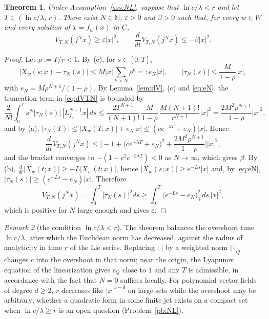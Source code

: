 \documentclass[preprint,12pt,authoryear]{elsarticle}
\newtheorem{theorem}{Theorem}
\theoremstyle{definition}
\theoremstyle{remark}
\newtheorem{remark}[theorem]{Remark}
\newcommand{\N}{\mathbb{N}}
\begin{document}
\begin{theorem}\label{thm:NL}
Under Assumption~\ref{ass:NL}, suppose that $\ln c/\lambda<r$ and let $T\in(\ln c/\lambda,\,r)$. There exist $N\in\N$, $\varepsilon>0$ and $\beta>0$ such that, for every $w\in W$ and every solution of $\dot x=f_w(x)$ in $C$,
\begin{equation}\label{eq:conclNL}
V_{T,N}(j^Nx)\ge\varepsilon|x|^2,\qquad\frac{d}{dt}V_{T,N}(j^Nx)\le-\beta|x|^2 .
\end{equation}
\end{theorem}
\begin{proof}
Let $\rho:=T/r<1$. By (c), for $s\in[0,T]$,
\begin{equation}\label{eq:eN}
|X_w(s;x)-\tau_N(s)|\le M|x|\sum_{k>N}\rho^k=:e_N|x|,\qquad |\tau_N(s)|\le\frac{M}{1-\rho}|x| ,
\end{equation}
with $e_N=M\rho^{N+1}/(1-\rho)$. By Lemma~\ref{lem:dV}, (c) and \eqref{eq:eN}, the truncation term in \eqref{eq:dVTN} is bounded by
\begin{equation}
\frac{2}{N!}\int_0^Ts^N|\tau_N(s)|\,|L_{f_w}^{N+1}x|\,ds\le\frac{2T^{N+1}}{(N+1)!}\,\frac{M}{1-\rho}\,\frac{M(N+1)!}{r^{N+1}}|x|^2=\frac{2M^2\rho^{N+1}}{1-\rho}|x|^2 ,
\end{equation}
and by (a), $|\tau_N(T)|\le|X_w(T;x)|+e_N|x|\le(ce^{-\lambda T}+e_N)|x|$. Hence
\begin{equation}
\frac{d}{dt}V_{T,N}(j^Nx)\le\Big[-1+\big(ce^{-\lambda T}+e_N\big)^2+\frac{2M^2\rho^{N+1}}{1-\rho}\Big]|x|^2 ,
\end{equation}
and the bracket converges to $-(1-c^2e^{-2\lambda T})<0$ as $N\to\infty$, which gives $\beta$. By (b), $\frac{d}{dt}|X_w(t;x)|\ge-L|X_w(t;x)|$, hence $|X_w(s;x)|\ge e^{-Ls}|x|$ and, by \eqref{eq:eN}, $|\tau_N(s)|\ge(e^{-Ls}-e_N)|x|$. Therefore
\begin{equation}
V_{T,N}(j^Nx)=\int_0^T|\tau_N(s)|^2ds\ge\int_0^T\big(e^{-Ls}-e_N\big)_+^2ds\,|x|^2 ,
\end{equation}
which is positive for $N$ large enough and gives $\varepsilon$.
\end{proof}

\begin{remark}[the condition $\ln c/\lambda<r$]
The theorem balances the overshoot time $\ln c/\lambda$, after which the Euclidean norm has decreased, against the radius of analyticity in time $r$ of the Lie series. Replacing $|\cdot|$ by a weighted norm $|\cdot|_Q$ changes $c$ into the overshoot in that norm; near the origin, the Lyapunov equation of the linearization gives $c_Q$ close to $1$ and any $T$ is admissible, in accordance with the fact that $N=0$ suffices locally. For polynomial vector fields of degree $d\ge2$, $r$ decreases like $|x|^{1-d}$ on large sets while the overshoot may be arbitrary; whether a quadratic form in some finite jet exists on a compact set when $\ln c/\lambda\ge r$ is an open question (Problem~\ref{pb:NL}).
\end{remark}
\end{document}
